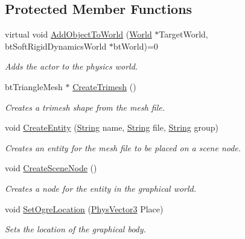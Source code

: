 \subsection*{Protected Member Functions}
\begin{DoxyCompactItemize}
\item 
virtual void \hyperlink{classphys_1_1ActorBase_ac5d4ad5a634b16000742f506ed5957fb}{AddObjectToWorld} (\hyperlink{classphys_1_1World}{World} $\ast$TargetWorld, btSoftRigidDynamicsWorld $\ast$btWorld)=0
\begin{DoxyCompactList}\small\item\em Adds the actor to the physics world. \item\end{DoxyCompactList}\item 
btTriangleMesh $\ast$ \hyperlink{classphys_1_1ActorBase_a4d2137276c50bbe5bc8cf9ecc66581b7}{CreateTrimesh} ()
\begin{DoxyCompactList}\small\item\em Creates a trimesh shape from the mesh file. \item\end{DoxyCompactList}\item 
void \hyperlink{classphys_1_1ActorBase_aff7dbb190fb982a43123bee3066501c4}{CreateEntity} (\hyperlink{namespacephys_aa03900411993de7fbfec4789bc1d392e}{String} name, \hyperlink{namespacephys_aa03900411993de7fbfec4789bc1d392e}{String} file, \hyperlink{namespacephys_aa03900411993de7fbfec4789bc1d392e}{String} group)
\begin{DoxyCompactList}\small\item\em Creates an entity for the mesh file to be placed on a scene node. \item\end{DoxyCompactList}\item 
void \hyperlink{classphys_1_1ActorBase_a125d6f0a0b4072e64490638c074eea2d}{CreateSceneNode} ()
\begin{DoxyCompactList}\small\item\em Creates a node for the entity in the graphical world. \item\end{DoxyCompactList}\item 
void \hyperlink{classphys_1_1ActorBase_af8a6cb524bda889b7a38f0245a7381fb}{SetOgreLocation} (\hyperlink{classPhysVector3}{PhysVector3} Place)
\begin{DoxyCompactList}\small\item\em Sets the location of the graphical body. \item\end{DoxyCompactList}\item 

\end{DoxyCompactItemize}
